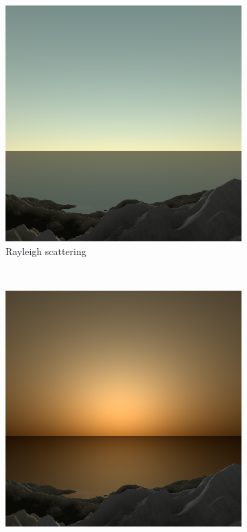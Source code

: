 \documentclass{article}
\begin{document}
\begin{figure}[H]
\centering
    \begin{subfigure}[b]{0.45\textwidth}
        \centering
        \includegraphics[scale=0.25]{scatterRayleigh}
        \caption{Rayleigh scattering}
        \label{fig:scatterRayleigh}
    \end{subfigure}
    ~
    \begin{subfigure}[b]{0.45\textwidth}
        \centering
        \includegraphics[scale=0.25]{scatterMie}

\end{subfigure}
\end{figure}
\end{document}
